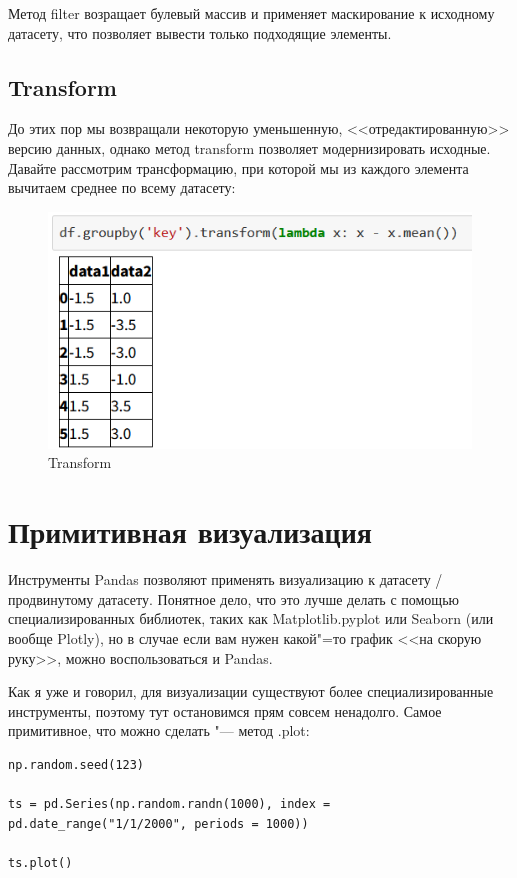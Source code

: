 \documentclass{article}
\begin{document}
Метод filter возращает булевый массив и применяет маскирование к исходному датасету, что позволяет вывести только подходящие элементы.

\subsection*{Transform}
До этих пор мы возвращали некоторую уменьшенную, <<отредактированную>> версию данных, однако метод transform позволяет модернизировать исходные. Давайте рассмотрим трансформацию, при которой мы из каждого элемента вычитаем среднее по всему датасету:
\begin{figure}[H]
    \centering
    \includegraphics[width=0.75\linewidth]{transform.png}
    \caption{Transform}
    \label{fig:enter-label}
\end{figure}

\section*{Примитивная визуализация}
Инструменты Pandas позволяют применять визуализацию к датасету / продвинутому датасету. Понятное дело, что это лучше делать с помощью специализированных библиотек, таких как Matplotlib.pyplot или Seaborn (или вообще Plotly), но в случае если вам нужен какой"=то график <<на скорую руку>>, можно воспользоваться и Pandas.

Как я уже и говорил, для визуализации существуют более специализированные инструменты, поэтому тут остановимся прям совсем ненадолго. Самое примитивное, что можно сделать "--- метод .plot:

\begin{verbatim}
np.random.seed(123)

ts = pd.Series(np.random.randn(1000), index = pd.date_range("1/1/2000", periods = 1000))

ts.plot()
\end{verbatim}
\end{document}
